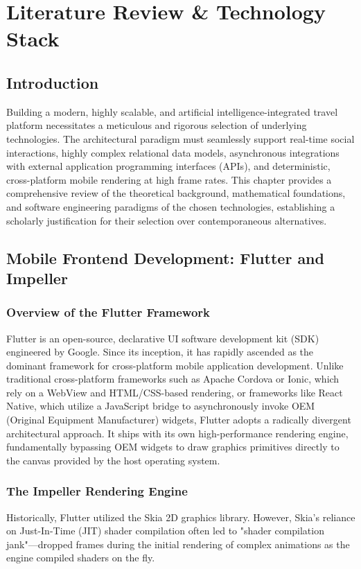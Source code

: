 \chapter{Literature Review \& Technology Stack}

\section{Introduction}
Building a modern, highly scalable, and artificial intelligence-integrated travel platform necessitates a meticulous and rigorous selection of underlying technologies. The architectural paradigm must seamlessly support real-time social interactions, highly complex relational data models, asynchronous integrations with external application programming interfaces (APIs), and deterministic, cross-platform mobile rendering at high frame rates. This chapter provides a comprehensive review of the theoretical background, mathematical foundations, and software engineering paradigms of the chosen technologies, establishing a scholarly justification for their selection over contemporaneous alternatives.

\section{Mobile Frontend Development: Flutter and Impeller}
\subsection{Overview of the Flutter Framework}
Flutter is an open-source, declarative UI software development kit (SDK) engineered by Google. Since its inception, it has rapidly ascended as the dominant framework for cross-platform mobile application development. Unlike traditional cross-platform frameworks such as Apache Cordova or Ionic, which rely on a WebView and HTML/CSS-based rendering, or frameworks like React Native, which utilize a JavaScript bridge to asynchronously invoke OEM (Original Equipment Manufacturer) widgets, Flutter adopts a radically divergent architectural approach. It ships with its own high-performance rendering engine, fundamentally bypassing OEM widgets to draw graphics primitives directly to the canvas provided by the host operating system.

\subsection{The Impeller Rendering Engine}
Historically, Flutter utilized the Skia 2D graphics library. However, Skia's reliance on Just-In-Time (JIT) shader compilation often led to "shader compilation jank"—dropped frames during the initial rendering of complex animations as the engine compiled shaders on the fly. 

